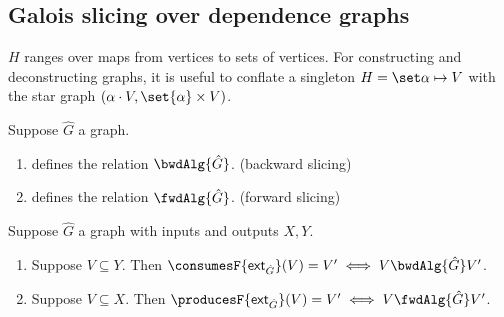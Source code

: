 \subsection{Galois slicing over dependence graphs}

$H$ ranges over maps from vertices to sets of vertices. For constructing and deconstructing graphs, it is
useful to conflate a singleton $H = \singleton{\alpha}{V}$ with the star graph $(\alpha \cons V, \set{\alpha}
\times V)$.

\begin{definition}
   \item Suppose $\hat{G} $ a graph.
   \begin{enumerate}
      \item {} defines the relation $\bwdAlg{\hat{G}}$. \hfill (backward slicing)
      \item {} defines the relation $\fwdAlg{\hat{G}}$. \hfill (forward slicing)
   \end{enumerate}
\end{definition}

\begin{theorem}
   \item Suppose $\hat{G}$ a graph with inputs and outputs $X, Y$.
   \begin{enumerate}
   \item Suppose $V \subseteq Y$. Then $\consumesF{\extension{\hat{G}}}(V) = V' \iff V \bwdAlg{\hat{G}} V'$.
   \item Suppose $V \subseteq X$. Then $\producesF{\extension{\hat{G}}}(V) = V' \iff V \fwdAlg{\hat{G}} V'$.
   \end{enumerate}
\end{theorem}


